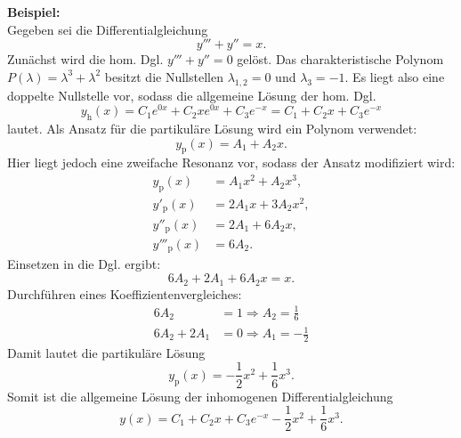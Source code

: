 \noindent
\textbf{Beispiel:}\\
Gegeben sei die Differentialgleichung
$$
y'''+y'' = x.
$$
Zun\"achst wird die hom. Dgl. $y'''+y'' =0$ gel\"ost.
Das charakteristische Polynom $P(\lambda) = \lambda^3 +\lambda^2$ besitzt die Nullstellen $\lambda_{1,2} = 0$ und $\lambda_3=-1$. Es liegt also eine doppelte Nullstelle vor, sodass die allgemeine L\"osung der hom. Dgl.
$$
y_{\text{h}}(x) = C_1 e^{0x} + C_2 x e^{0x}+ C_3 e^{-x} = C_1 + C_2 x + C_3 e^{-x}
$$
lautet.
Als Ansatz f\"ur die partikul\"are L\"osung wird ein Polynom verwendet:
$$
y_{\text{p}}(x) = A_1 + A_2 x.
$$
Hier liegt jedoch eine zweifache Resonanz vor, sodass der Ansatz modifiziert wird:
\begin{align*}
y_{\text{p}}(x) &= A_1 x^2 + A_2 x^3,\\
y'_{\text{p}}(x) &= 2 A_1x +3 A_2x^2, \\
y''_{\text{p}}(x) &= 2 A_1 +6 A_2 x, \\
y'''_{\text{p}}(x) &= 6 A_2.
\end{align*}
Einsetzen in die Dgl. ergibt:
$$
6 A_2 +2 A_1 +6 A_2 x = x.
$$
Durchf\"uhren eines Koeffizientenvergleiches:
\begin{align*}
6 A_2 &= 1 \Rightarrow A_2 = \frac{1}{6}\\
6A_2+2A_1 &= 0 \Rightarrow A_1 = - \frac{1}{2}
\end{align*}
Damit lautet die partikul\"are L\"osung
$$
y_{\text{p}}(x) = - \frac{1}{2} x^2 +  \frac{1}{6} x^3.
$$
Somit ist die allgemeine L\"osung der inhomogenen Differentialgleichung
$$
y(x) = C_1 + C_2 x + C_3 e^{-x}- \frac{1}{2} x^2 +  \frac{1}{6} x^3.
$$
